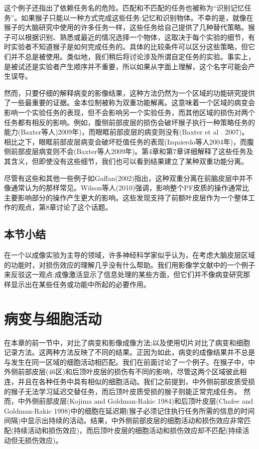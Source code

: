 \par
这个例子还指出了依赖任务名的危险。匹配和不匹配的任务也被称为“识别记忆任务”。如果猴子只能以一种方式完成这些任务:记忆和识别物体。不幸的是，就像在猴子的大脑研究中使用的许多任务一样，这些任务给自己提供了几种替代策略。猴子可以根据识别、熟悉或最近的情况选择一个物体，这取决于每个实验的细节，有时实验者不知道猴子是如何完成任务的。具体的比较条件可以区分这些策略，但它们并不总是被使用。类似地，我们稍后将讨论涉及所谓自定任务的实验。事实上，是被试还是实验者产生顺序并不重要，所以如果从字面上理解，这个名字可能会产生误导。

\par
然而，只要仔细的解释病变的影像结果，这种方法仍然为一个区域的功能研究提供了一些最重要的证据。金本位制被称为双重功能解离。这意味着一个区域的病变会影响一个实验任务的表现，但不会影响另一个实验任务，而其他区域的损伤对两个任务都有相反的影响。例如，腹侧前部皮层的损伤会破坏猴子执行一种策略任务的能力(Baxter等人)2009年)，而眼眶前部皮层的病变则没有(Baxter et al . 2007)。相比之下，眼眶前部皮层病变会破坏贬值任务的表现(Izquierdo等人2004年)，而腹侧前部皮层病变则不会(Baxter等人2009年)。第4章和第7章详细解释了这些任务及其含义，但即使没有这些细节，我们也可以看到结果建立了某种双重功能分离。

\par
尽管有这些和其他一些例子如Gaffan(2002)指出，这种双重分离在前脑皮层中并不像通常认为的那样常见。Wilson等人(2010)强调，影响整个PF皮质的操作通常比主要影响部分的操作产生更大的影响。这些发现支持了前额叶皮层作为一个整体工作的观点，第8章讨论了这个话题。

\subsection{本节小结}
在一个以成像实验为主导的领域，许多神经科学家似乎认为，在考虑大脑皮层区域的功能时，对损伤效应的理解几乎没有什么帮助。我们用影像学文献中的一个例子来反驳这一观点:成像激活显示了信息处理的某些方面，但它们并不像病变研究那样显示出在某些任务或功能中所起的必要作用。


\section{病变与细胞活动}
在本章的前一节中，对比了病变和影像成像方法;以及使用切片对比了病变和细胞记录方法。这两种方法反映了不同的结果。正因为如此，病变的成像结果并不总是与发生在同一区域的细胞活动相匹配。我们在前面讨论了一个例子。在猴子中，中外侧前部皮层(46区)和后顶叶皮层的损伤有不同的影响，尽管这两个区域彼此相连，并且在各种任务中具有相似的细胞活动。我们之前提到，中外侧前部皮质受损的猴子无法学习延迟交替任务，而后顶叶皮质受损的猴子则能正常完成任务。
然而，中外侧前部皮层(Kojima and Goldman-Rakic 1984)和后顶叶皮层(Chafee and Goldman-Rakic 1998)中的细胞在延迟期(猴子必须记住执行任务所需的信息的时间间隔)中显示出持续的活动。结果，中外侧前部皮层的细胞活动和损伤效应非常匹配(持续活动和损伤效应)，而后顶叶皮层的细胞活动和损伤效应却不匹配(持续活动但无损伤效应)。

